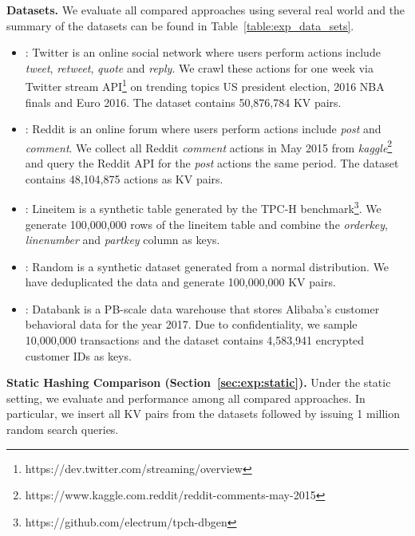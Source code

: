 \vspace{1mm}\noindent\textbf{Datasets.} We evaluate all compared approaches using several real world and the summary of the datasets can be found in Table~\ref{table:exp_data_sets}.
\begin{itemize}
	\item \dstwitter: Twitter is an online social network where users perform actions include \emph{tweet}, \emph{retweet}, \emph{quote} and \emph{reply}.
	We crawl these actions for one week via Twitter stream API\footnote{https://dev.twitter.com/streaming/overview} on trending topics US president election, 2016 NBA finals and Euro 2016. The dataset contains 50,876,784 KV pairs.
	\item \dsreddit: Reddit is an online forum where users perform actions include \emph{post} and \emph{comment}. We collect all Reddit \emph{comment} actions in May 2015 from \emph{kaggle}\footnote{https://www.kaggle.com.reddit/reddit-comments-may-2015} and query the Reddit API for the \emph{post} actions the same period. The dataset contains 48,104,875 actions as KV pairs. 
 	\item \dstpch: Lineitem is a synthetic table generated by the TPC-H benchmark\footnote{https://github.com/electrum/tpch-dbgen}. We generate  100,000,000 rows of the lineitem table and combine the \emph{orderkey}, \emph{linenumber} and \emph{partkey} column as keys. 
	\item \dsrandom: Random is a synthetic dataset generated from a normal distribution. We have deduplicated the data and generate 100,000,000 KV pairs.  
	\item \dsali: Databank is a PB-scale data warehouse that stores Alibaba's customer behavioral data for the year 2017. Due to confidentiality, we sample 10,000,000 transactions and the dataset contains 4,583,941 encrypted customer IDs as keys.
\end{itemize}






%



\vspace{1mm}\noindent\textbf{Static Hashing Comparison (Section~\ref{sec:exp:static}).}
Under the static setting, we evaluate  and  performance among all compared approaches. 
In particular, we insert all KV pairs from the datasets followed by issuing 1 million random search queries. 



